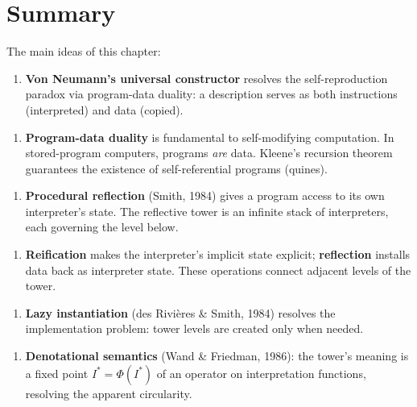 \section{Summary}

The main ideas of this chapter:

\begin{enumerate}
\item \textbf{Von Neumann's universal constructor} resolves the self-reproduction paradox via program-data duality: a description serves as both instructions (interpreted) and data (copied).
\end{enumerate}

\begin{enumerate}
\item \textbf{Program-data duality} is fundamental to self-modifying computation. In stored-program computers, programs \textit{are} data. Kleene's recursion theorem guarantees the existence of self-referential programs (quines).
\end{enumerate}

\begin{enumerate}
\item \textbf{Procedural reflection} (Smith, 1984) gives a program access to its own interpreter's state. The reflective tower is an infinite stack of interpreters, each governing the level below.
\end{enumerate}

\begin{enumerate}
\item \textbf{Reification} makes the interpreter's implicit state explicit; \textbf{reflection} installs data back as interpreter state. These operations connect adjacent levels of the tower.
\end{enumerate}

\begin{enumerate}
\item \textbf{Lazy instantiation} (des Rivières \& Smith, 1984) resolves the implementation problem: tower levels are created only when needed.
\end{enumerate}

\begin{enumerate}
\item \textbf{Denotational semantics} (Wand \& Friedman, 1986): the tower's meaning is a fixed point $I^* = \Phi(I^*)$ of an operator on interpretation functions, resolving the apparent circularity.
\end{enumerate}

